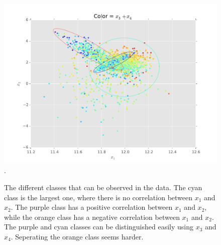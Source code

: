 \documentclass[paper=a4, fontsize=10pt]{scrartcl} %
\numberwithin{equation}{section} %
\numberwithin{figure}{section} %
\numberwithin{table}{section} %
\begin{document}
\begin{figure}[h!]
	\centering
	\includegraphics[width=\textwidth]{exercise_11_annotated.pdf}.
	\caption{The different classes that can be observed in the data. The cyan class is the largest one, where there is no correlation between $x_1$ and $x_2$. The purple class has a positive correlation between $x_1$ and $x_2$, while the orange class has a negative correlation between $x_1$ and $x_2$. The purple and cyan classes can be distinguished easily using $x_3$ and $x_4$. Seperating the orange class seems harder.}
	\label{visualization_annotated}
\end{figure}
\end{document}
